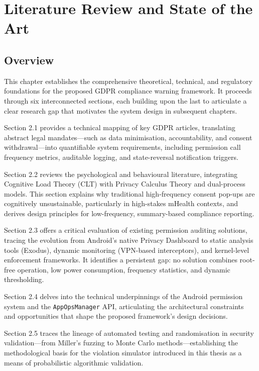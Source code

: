 \newpage\section{Literature Review and State of the Art}

\subsection{Overview}
This chapter establishes the comprehensive theoretical, technical, and regulatory foundations for the proposed GDPR compliance warning framework. It proceeds through six interconnected sections, each building upon the last to articulate a clear research gap that motivates the system design in subsequent chapters.

Section 2.1 provides a technical mapping of key GDPR articles, translating abstract legal mandates—such as data minimisation, accountability, and consent withdrawal—into quantifiable system requirements, including permission call frequency metrics, auditable logging, and state-reversal notification triggers.

Section 2.2 reviews the psychological and behavioural literature, integrating Cognitive Load Theory (CLT) with Privacy Calculus Theory and dual-process models. This section explains why traditional high-frequency consent pop-ups are cognitively unsustainable, particularly in high-stakes mHealth contexts, and derives design principles for low-frequency, summary-based compliance reporting.

Section 2.3 offers a critical evaluation of existing permission auditing solutions, tracing the evolution from Android's native Privacy Dashboard to static analysis tools (Exodus), dynamic monitoring (VPN-based interceptors), and kernel-level enforcement frameworks. It identifies a persistent gap: no solution combines root-free operation, low power consumption, frequency statistics, and dynamic thresholding.

Section 2.4 delves into the technical underpinnings of the Android permission system and the \texttt{AppOpsManager} API, articulating the architectural constraints and opportunities that shape the proposed framework's design decisions.

Section 2.5 traces the lineage of automated testing and randomisation in security validation—from Miller's fuzzing to Monte Carlo methods—establishing the methodological basis for the violation simulator introduced in this thesis as a means of probabilistic algorithmic validation.

